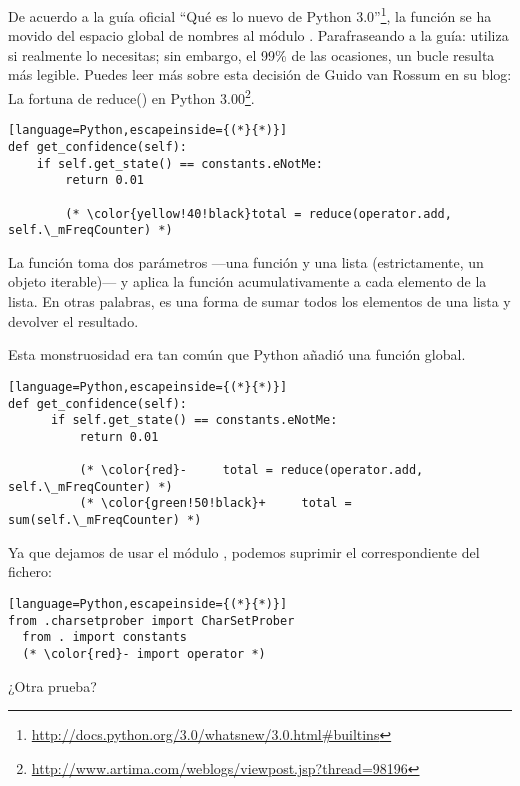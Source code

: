 De acuerdo a la guía oficial ``Qué es lo nuevo de Python 3.0''\footnote{\href{http://docs.python.org/3.0/whatsnew/3.0.html\#builtins}{http://docs.python.org/3.0/whatsnew/3.0.html\#builtins}}, la función  se ha movido del espacio global de nombres al módulo . Parafraseando a la guía: utiliza  si realmente lo necesitas; sin embargo, el 99\% de las ocasiones, un bucle  resulta más legible. Puedes leer más sobre esta decisión de Guido van Rossum en su blog: La fortuna de reduce() en Python 3.00\footnote{\href{http://www.artima.com/weblogs/viewpost.jsp?thread=98196}{http://www.artima.com/weblogs/viewpost.jsp?thread=98196}}.


\begin{lstlisting}[language=Python,escapeinside={(*}{*)}]
def get_confidence(self):
    if self.get_state() == constants.eNotMe:
        return 0.01
  
        (* \color{yellow!40!black}total = reduce(operator.add, self.\_mFreqCounter) *)
\end{lstlisting}

La función  toma dos parámetros ---una función y una lista (estrictamente, un objeto iterable)--- y aplica la función acumulativamente a cada elemento de la lista. En otras palabras, es una forma de sumar todos los elementos de una lista y devolver el resultado.

Esta monstruosidad era tan común que Python añadió una función  global.


\begin{lstlisting}[language=Python,escapeinside={(*}{*)}]
def get_confidence(self):
      if self.get_state() == constants.eNotMe:
          return 0.01

          (* \color{red}-     total = reduce(operator.add, self.\_mFreqCounter) *)
          (* \color{green!50!black}+     total = sum(self.\_mFreqCounter) *)
\end{lstlisting}

Ya que dejamos de usar el módulo , podemos suprimir el  correspondiente del fichero:


\begin{lstlisting}[language=Python,escapeinside={(*}{*)}]
from .charsetprober import CharSetProber
  from . import constants
  (* \color{red}- import operator *)
\end{lstlisting}

¿Otra prueba?

